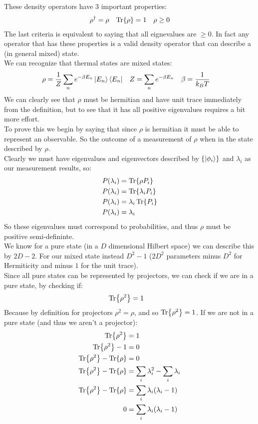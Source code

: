 These density operators have 3 important properties:
\begin{align*}
	\rho^\dagger &= \rho &
	\Tr{\rho} &= 1 &
	\rho \geq 0
\end{align*}
The last criteria is equivalent to saying that all eignevalues are $\geq 0$. In fact any operator that has these properties is a valid density operator that can describe a (in general mixed) state. \\
We can recognize that thermal states are mixed states:
\begin{align*}
	\rho &= \frac{1}{Z} \sum_n e^{-\beta E_n} \ket{E_n}\bra{E_n} &
	Z &= \sum_n e^{-\beta E_n} &
	\beta &= \frac{1}{k_B T}
\end{align*}
We can clearly see that $\rho$ must be hermitian and have unit trace immediately from the definition, but to see that it has all positive eigenvalues requires a bit more effort.\\
To prove this we begin by saying that since $\rho$ is hermitian it must be able to represent an observable. So the outcome of a measurement of $\rho$ when in the state described by $\rho$. \\
Clearly we must have eigenvalues and eigenvectors described by $\{\ket{\phi_i}\}$ and $\lambda_i$ as our measurement results, so:
\begin{align*}
	P(\lambda_i) &= \Tr{\rho P_i} \\
	P(\lambda_i) &= \Tr{\lambda_i P_i} \\
	P(\lambda_i) &= \lambda_i \Tr{P_i} \\
	P(\lambda_i) &= \lambda_i
\end{align*}
So these eigenvalues must correspond to probabilities, and thus $\rho$ must be positive semi-defininte. \\
We know for a pure state (in a $D$ dimensional Hilbert space) we can describe this by $2D-2$. For our mixed state instead $D^2 -1$ ($2D^2$ parameters minus $D^2$ for Hermiticity and minus $1$ for the unit trace).\\
Since all pure states can be represented by projectors, we can check if we are in a pure state, by checking if:
\begin{align*}
	\Tr{\rho^2} &= 1
\end{align*}
Because by definition for projectors $\rho^2 = \rho$, and so $\Tr{\rho^2} =1$. If we are not in a pure state (and thus we aren't a projector):
\begin{align*}
	\Tr{\rho^2} &= 1 \\
	\Tr{\rho^2} - 1 &= 0 \\
	\Tr{\rho^2} - \Tr{\rho} &= 0 \\
	\Tr{\rho^2} -\Tr{\rho} &= \sum_i \lambda_i^2 -\sum_i\lambda_i\\
	\Tr{\rho^2} -\Tr{\rho}&= \sum_i \lambda_i(\lambda_i -1) \\
	0 &= \sum_i \lambda_i(\lambda_i -1)
\end{align*}
